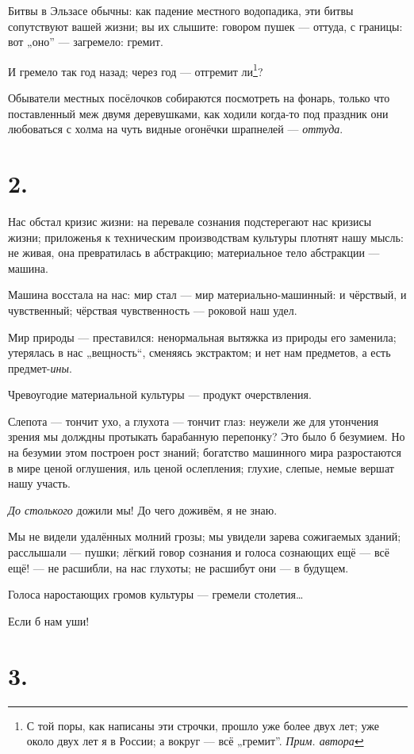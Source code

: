 \documentclass[12pt,a4paper,oneside]{book}
\begin{document}
Битвы в Эльзасе обычны: как падение местного водопадика, эти битвы сопутствуют вашей жизни; вы их слышите: говором пушек — оттуда, с границы: вот „оно” — загремело: гремит.

И гремело так год назад; через год — отгремит ли\footnote{С той поры, как написаны эти строчки, прошло уже более двух лет; уже около двух лет я в России; а вокруг — всё „гремит”. \emph{Прим. автора}}?

Обыватели местных посёлочков собираются посмотреть на фонарь, только что поставленный меж двумя деревушками, как ходили когда-то под праздник они любоваться с холма на чуть видные огонёчки шрапнелей — \emph{оттуда}.

\section*{2.}

Нас обстал кризис жизни: на перевале сознания подстерегают нас кризисы жизни; приложенья к техническим производствам культуры плотнят нашу мысль: не живая, она превратилась в абстракцию; материальное тело абстракции — машина.

Машина восстала на нас: мир стал — мир материально-машинный: и чёрствый, и чувственный; чёрствая чувственность — роковой наш удел.

Мир природы — преставился: ненормальная вытяжка из природы его заменила; утерялась в нас „вещность“, сменяясь экстрактом; и нет нам предметов, а есть предмет-\emph{ины}.

Чревоугодие материальной культуры — продукт очерствления.

Слепота — тончит ухо, а глухота — тончит глаз: неужели же для утончения зрения мы долждны протыкать барабанную перепонку? Это было б безумием. Но на безумии этом построен рост знаний; богатство машинного мира разростаются в мире ценой оглушения, иль ценой ослепления; глухие, слепые, немые вершат нашу участь.

\emph{До столького} дожили мы! До чего доживём, я не знаю.

Мы не видели удалённых молний грозы; мы увидели зарева сожигаемых зданий; расслышали — пушки; лёгкий говор сознания и голоса сознающих ещё — всё ещё! — не расшибли, на нас глухоты; не расшибут они — в будущем.

Голоса наростающих громов культуры — гремели столетия…

Если б нам уши!

\section*{3.}
\end{document}

